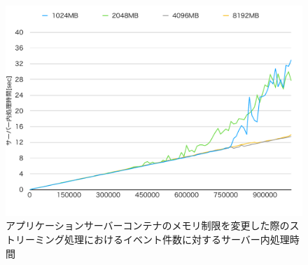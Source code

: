 \documentclass[../../../../../main]{subfiles}
\begin{document}
    \begin{figure}[H]
        \centering
        \includegraphics[width=12cm]{graph}
        \caption{アプリケーションサーバーコンテナのメモリ制限を変更した際のストリーミング処理におけるイベント件数に対するサーバー内処理時間}
        \label{fig:stream-change-app-memory-limit-server-time-app_4_db_1_1024}
    \end{figure}
\end{document}

